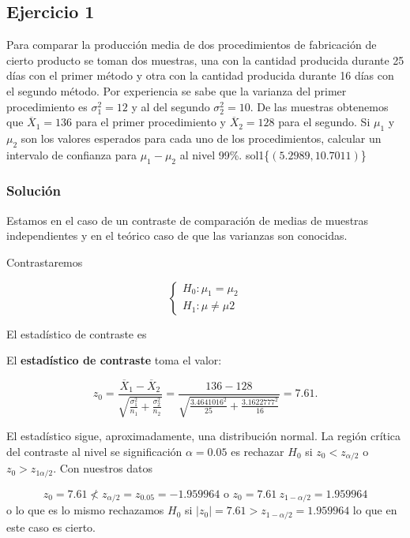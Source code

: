 \documentclass[
]{article}
\begin{document}
\hypertarget{ejercicio-1}{%
\subsection{Ejercicio 1}\label{ejercicio-1}}

Para comparar la producción media de dos procedimientos de fabricación
de cierto producto se toman dos muestras, una con la cantidad producida
durante 25 días con el primer método y otra con la cantidad producida
durante 16 días con el segundo método. Por experiencia se sabe que la
varianza del primer procedimiento es \(\sigma_{1}^2=12\) y al del
segundo \(\sigma_{2}^2=10\). De las muestras obtenemos que
\(\overline{X}_{1}=136\) para el primer procedimiento y
\(\overline{X}_{2}=128\) para el segundo. Si \(\mu_{1}\) y \(\mu_{2}\)
son los valores esperados para cada uno de los procedimientos, calcular
un intervalo de confianza para \(\mu_{1}-\mu_{2}\) al nivel 99\%.
sol1\{\(\left(5.2989,10.7011\right)\)\}

\hypertarget{soluciuxf3n}{%
\subsubsection{Solución}\label{soluciuxf3n}}

Estamos en el caso de un contraste de comparación de medias de muestras
independientes y en el teórico caso de que las varianzas son conocidas.

Contrastaremos

\[
\left\{
\begin{array}{ll}
H_{0}:\mu_1=\mu_2\\
H_{1}:\mu\not= \mu2 
\end{array}
\right.
\]

El estadístico de contraste es

El \textbf{estadístico de contraste} toma el valor:

\[z_0=\dfrac{\overline{X}_1-\overline{X}_2}{\sqrt{\frac{\sigma_1^2}{n_1}+\frac{\sigma_2^2}{n_2}}}=\frac{136-128}{\sqrt{\frac{3.4641016^2}{25}+\frac{3.1622777^2}{16}}}=7.61.\]

El estadístico sigue, aproximadamente, una distribución normal. La
región crítica del contraste al nivel se significación \(\alpha=0.05\)
es rechazar \(H_0\) si \(z_0<z_{\alpha/2}\) o \(z_0>z_{1\alpha/2}\). Con
nuestros datos

\[z_0=7.61\not< z_{\alpha/2}=z_{0.05}=-1.959964 \mbox{ o } z_0=7.61  \> z_{1-\alpha/2}=1.959964\]
o lo que es lo mismo rechazamos \(H_0\) si
\(|z_0|=7.61> z_{1-\alpha/2}=1.959964\) lo que en este caso es cierto.
\end{document}
